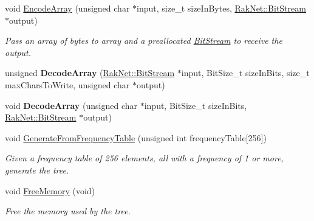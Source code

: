 \begin{DoxyCompactItemize}
\item 
void \hyperlink{class_rak_net_1_1_huffman_encoding_tree_aecad5eab19cc648edfef7ada23a73278}{Encode\-Array} (unsigned char $\ast$input, size\-\_\-t size\-In\-Bytes, \hyperlink{class_rak_net_1_1_bit_stream}{Rak\-Net\-::\-Bit\-Stream} $\ast$output)
\begin{DoxyCompactList}\small\item\em Pass an array of bytes to array and a preallocated \hyperlink{class_rak_net_1_1_bit_stream}{Bit\-Stream} to receive the output. \end{DoxyCompactList}\item 
\hypertarget{class_rak_net_1_1_huffman_encoding_tree_a0e91b3afa18de8a421b1f14cea55e942}{unsigned {\bfseries Decode\-Array} (\hyperlink{class_rak_net_1_1_bit_stream}{Rak\-Net\-::\-Bit\-Stream} $\ast$input, Bit\-Size\-\_\-t size\-In\-Bits, size\-\_\-t max\-Chars\-To\-Write, unsigned char $\ast$output)}\label{class_rak_net_1_1_huffman_encoding_tree_a0e91b3afa18de8a421b1f14cea55e942}

\item 
\hypertarget{class_rak_net_1_1_huffman_encoding_tree_aa308ff3dec14d0a7ccdb4269c8708eb0}{void {\bfseries Decode\-Array} (unsigned char $\ast$input, Bit\-Size\-\_\-t size\-In\-Bits, \hyperlink{class_rak_net_1_1_bit_stream}{Rak\-Net\-::\-Bit\-Stream} $\ast$output)}\label{class_rak_net_1_1_huffman_encoding_tree_aa308ff3dec14d0a7ccdb4269c8708eb0}

\item 
\hypertarget{class_rak_net_1_1_huffman_encoding_tree_a1d2fe539dfdd920c5f497af6eb1b05b7}{void \hyperlink{class_rak_net_1_1_huffman_encoding_tree_a1d2fe539dfdd920c5f497af6eb1b05b7}{Generate\-From\-Frequency\-Table} (unsigned int frequency\-Table\mbox{[}256\mbox{]})}\label{class_rak_net_1_1_huffman_encoding_tree_a1d2fe539dfdd920c5f497af6eb1b05b7}

\begin{DoxyCompactList}\small\item\em Given a frequency table of 256 elements, all with a frequency of 1 or more, generate the tree. \end{DoxyCompactList}\item 
\hypertarget{class_rak_net_1_1_huffman_encoding_tree_a75ed89191435d5177a5303db59ab83bf}{void \hyperlink{class_rak_net_1_1_huffman_encoding_tree_a75ed89191435d5177a5303db59ab83bf}{Free\-Memory} (void)}\label{class_rak_net_1_1_huffman_encoding_tree_a75ed89191435d5177a5303db59ab83bf}

\begin{DoxyCompactList}\small\item\em Free the memory used by the tree. \end{DoxyCompactList}\end{DoxyCompactItemize}


